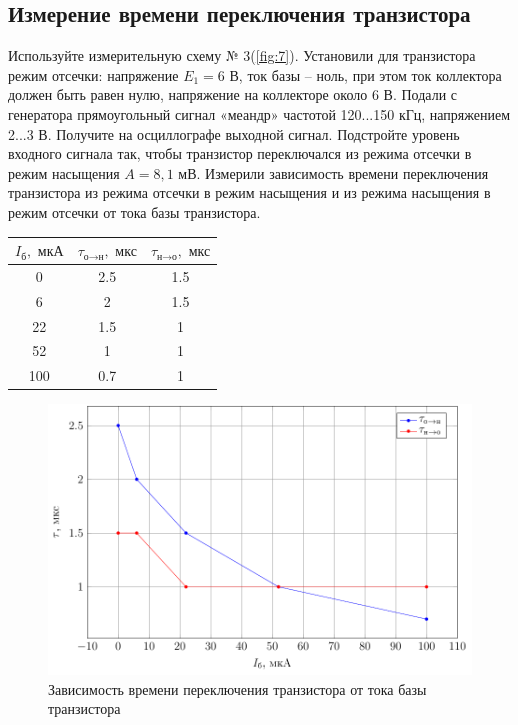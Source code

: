 \subsection{Измерение времени переключения транзистора}%
Используйте измерительную схему № 3(\ref{fig:7}). Установили для транзистора
режим отсечки: напряжение $E_1 = 6 \text{ В}$, ток базы – ноль, при этом ток коллектора
должен быть равен нулю, напряжение на коллекторе около 6 В. Подали с
генератора прямоугольный сигнал «меандр» частотой 120...150 кГц,
напряжением 2...3 В. Получите на осциллографе выходной сигнал.
Подстройте уровень входного сигнала так, чтобы транзистор
переключался из режима отсечки в режим насыщения $A=8,1\text{ мВ}$. Измерили зависимость
времени переключения транзистора из режима отсечки в режим насыщения и
из режима насыщения в режим отсечки от тока базы транзистора.
\begin{table}[htbp]
	\centering
	\begin{tabular}{|c|c|c|}
		\toprule
		$I_\text{б}, \text{ мкА}$ & $\tau_{\text{о}\to\text{н}}, \text{ мкс}$ & $\tau_{\text{н}\to\text{о}}, \text{ мкс} $\\
		\midrule
		0     & 2.5   & 1.5 \\
		\midrule
		6     & 2     & 1.5 \\
		\midrule
		22    & 1.5   & 1 \\
		\midrule
		52    & 1     & 1 \\
		\midrule
		100   & 0.7   & 1 \\
		\bottomrule
	\end{tabular}%
\end{table}%

\begin{figure}[H]
    \centering
    \includegraphics[scale=1]{plot/plot5}
    \caption{Зависимость времени переключения транзистора от тока базы транзистора}
    \label{fig:6}
\end{figure}
